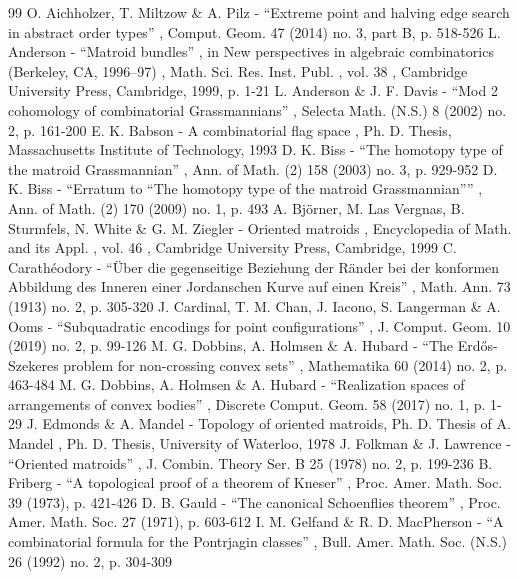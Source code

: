 \documentclass[11pt]{article}
\numberwithin{equation}{section}
\theoremstyle{remark}
\begin{document}
\begin{thebibliography}{99}
 O. Aichholzer, T. Miltzow \& A. Pilz - “Extreme point and halving edge search in abstract order types” , Comput. Geom. 47 (2014) no. 3, part B, p. 518-526
 L. Anderson - “Matroid bundles” , in New perspectives in algebraic combinatorics (Berkeley, CA, 1996–97) , Math. Sci. Res. Inst. Publ. , vol. 38 , Cambridge University Press, Cambridge, 1999, p. 1-21
 L. Anderson \& J. F. Davis - “Mod 2 cohomology of combinatorial Grassmannians” , Selecta Math. (N.S.) 8 (2002) no. 2, p. 161-200
 E. K. Babson - A combinatorial flag space , Ph. D. Thesis, Massachusetts Institute of Technology, 1993
 D. K. Biss - “The homotopy type of the matroid Grassmannian” , Ann. of Math. (2) 158 (2003) no. 3, p. 929-952
 D. K. Biss - “Erratum to “The homotopy type of the matroid Grassmannian”” , Ann. of Math. (2) 170 (2009) no. 1, p. 493
 A. Björner, M. Las Vergnas, B. Sturmfels, N. White \& G. M. Ziegler - Oriented matroids , Encyclopedia of Math. and its Appl. , vol. 46 , Cambridge University Press, Cambridge, 1999
 C. Carathéodory - “Über die gegenseitige Beziehung der Ränder bei der konformen Abbildung des Inneren einer Jordanschen Kurve auf einen Kreis” , Math. Ann. 73 (1913) no. 2, p. 305-320
 J. Cardinal, T. M. Chan, J. Iacono, S. Langerman \& A. Ooms - “Subquadratic encodings for point configurations” , J. Comput. Geom. 10 (2019) no. 2, p. 99-126
 M. G. Dobbins, A. Holmsen \& A. Hubard - “The Erdős-Szekeres problem for non-crossing convex sets” , Mathematika 60 (2014) no. 2, p. 463-484
 M. G. Dobbins, A. Holmsen \& A. Hubard - “Realization spaces of arrangements of convex bodies” , Discrete Comput. Geom. 58 (2017) no. 1, p. 1-29
 J. Edmonds \& A. Mandel - Topology of oriented matroids, Ph. D. Thesis of A. Mandel , Ph. D. Thesis, University of Waterloo, 1978
 J. Folkman \& J. Lawrence - “Oriented matroids” , J. Combin. Theory Ser. B 25 (1978) no. 2, p. 199-236
 B. Friberg - “A topological proof of a theorem of Kneser” , Proc. Amer. Math. Soc. 39 (1973), p. 421-426
 D. B. Gauld - “The canonical Schoenflies theorem” , Proc. Amer. Math. Soc. 27 (1971), p. 603-612
 I. M. Gelfand \& R. D. MacPherson - “A combinatorial formula for the Pontrjagin classes” , Bull. Amer. Math. Soc. (N.S.) 26 (1992) no. 2, p. 304-309

\end{thebibliography}
\end{document}
